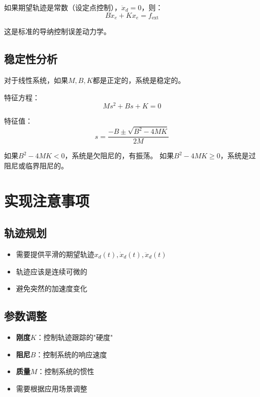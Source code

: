 \documentclass[12pt,a4paper]{article}
\begin{document}
如果期望轨迹是常数（设定点控制），$\ddot{x}_d = 0$，则：
\begin{equation}
B\dot{x}_e + Kx_e = f_{\text{ext}}
\end{equation}

这是标准的导纳控制误差动力学。

\subsection{稳定性分析}

对于线性系统，如果$M, B, K$都是正定的，系统是稳定的。

特征方程：
\begin{equation}
Ms^2 + Bs + K = 0
\end{equation}

特征值：
\begin{equation}
s = \frac{-B \pm \sqrt{B^2 - 4MK}}{2M}
\end{equation}

如果$B^2 - 4MK < 0$，系统是欠阻尼的，有振荡。
如果$B^2 - 4MK \geq 0$，系统是过阻尼或临界阻尼的。

\section{实现注意事项}

\subsection{轨迹规划}

\begin{itemize}
\item 需要提供平滑的期望轨迹$x_d(t), \dot{x}_d(t), \ddot{x}_d(t)$
\item 轨迹应该是连续可微的
\item 避免突然的加速度变化
\end{itemize}

\subsection{参数调整}

\begin{itemize}
\item \textbf{刚度$K$}：控制轨迹跟踪的"硬度"
\item \textbf{阻尼$B$}：控制系统的响应速度
\item \textbf{质量$M$}：控制系统的惯性
\item 需要根据应用场景调整
\end{itemize}
\end{document}
